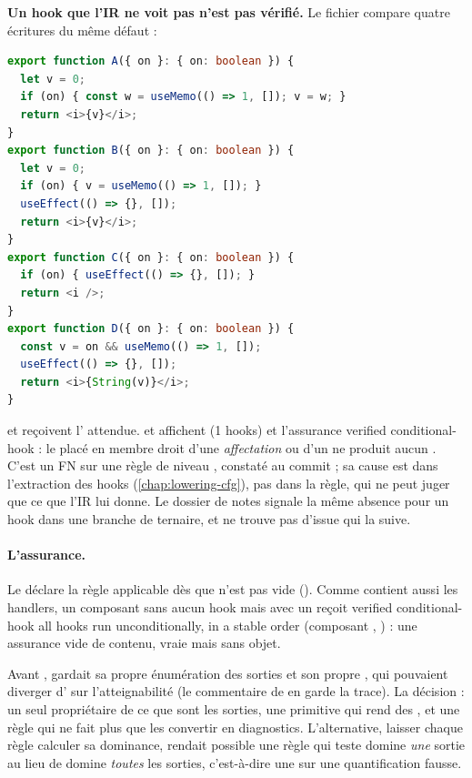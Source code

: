 \begin{piege}
\textbf{Un hook que l'IR ne voit pas n'est pas vérifié.} Le fichier  compare quatre écritures du même défaut :
\begin{lstlisting}[language=TypeScript]
export function A({ on }: { on: boolean }) {
  let v = 0;
  if (on) { const w = useMemo(() => 1, []); v = w; }
  return <i>{v}</i>;
}
export function B({ on }: { on: boolean }) {
  let v = 0;
  if (on) { v = useMemo(() => 1, []); }
  useEffect(() => {}, []);
  return <i>{v}</i>;
}
export function C({ on }: { on: boolean }) {
  if (on) { useEffect(() => {}, []); }
  return <i />;
}
export function D({ on }: { on: boolean }) {
  const v = on && useMemo(() => 1, []);
  useEffect(() => {}, []);
  return <i>{String(v)}</i>;
}
\end{lstlisting}
 et  reçoivent l'\Error{} attendue.  et  affichent \og (1 hooks)\fg{} et l'assurance \og verified conditional-hook\fg{} : le  placé en membre droit d'une \emph{affectation} ou d'un \code{&&} ne produit aucun . C'est un FN sur une règle de niveau \Error, constaté au commit \snapshotCommit{} ; sa cause est dans l'extraction des hooks (\cref{chap:lowering-cfg}), pas dans la règle, qui ne peut juger que ce que l'IR lui donne. Le dossier de notes signale la même absence pour un hook dans une branche de ternaire, et ne trouve pas d'issue qui la suive.
\end{piege}

\paragraph{L'assurance.} Le  déclare la règle applicable dès que  n'est pas vide (). Comme  contient aussi les handlers, un composant sans aucun hook mais avec un  reçoit \og verified conditional-hook all hooks run unconditionally, in a stable order\fg{} (composant , ) : une assurance vide de contenu, vraie mais sans objet.

\begin{decision}
Avant ,  gardait sa propre énumération des sorties et son propre , qui pouvaient diverger d' sur l'atteignabilité (le commentaire de  en garde la trace). La décision : un seul propriétaire de \og ce que sont les sorties\fg{}, une primitive qui rend des , et une règle qui ne fait plus que les convertir en diagnostics. L'alternative, laisser chaque règle calculer sa dominance, rendait possible une règle qui teste \og domine \emph{une} sortie\fg{} au lieu de \og domine \emph{toutes} les sorties\fg{}, c'est-à-dire une \Error{} sur une quantification fausse.
\end{decision}


